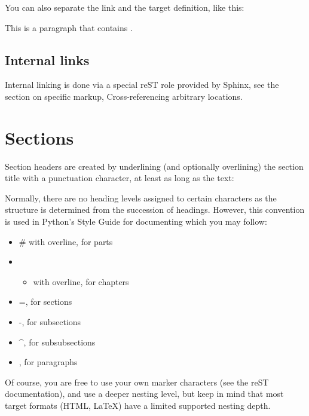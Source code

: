 \documentclass[letterpaper,10pt,english]{sphinxmanual}
\begin{document}
You can also separate the link and the target definition, like this:

This is a paragraph that contains .


\subsection{Internal links}
\label{\detokenize{usage/introduction:a-link}}\label{\detokenize{usage/introduction:internal-links}}
Internal linking is done via a special reST role provided by Sphinx, see the section on specific markup, Cross-referencing arbitrary locations.


\section{Sections}
\label{\detokenize{usage/introduction:sections}}
Section headers are created by underlining (and optionally overlining) the section title with a punctuation character,
at least as long as the text:

Normally, there are no heading levels assigned to certain characters as the structure is determined from the succession of headings.
However, this convention is used in Python’s Style Guide for documenting which you may follow:
\begin{itemize}
\item {} 
\# with overline, for parts

\item {} \begin{itemize}
\item {} 
with overline, for chapters

\end{itemize}

\item {} 
=, for sections

\item {} 
-, for subsections

\item {} 
\textasciicircum{}, for subsubsections

\item {} 
\sphinxquotedblright{}, for paragraphs

\end{itemize}

Of course, you are free to use your own marker characters (see the reST documentation), and use a deeper nesting level,
but keep in mind that most target formats (HTML, LaTeX) have a limited supported nesting depth.
\end{document}
